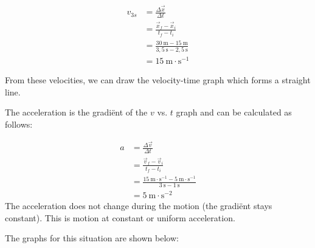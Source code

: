     \begin{align*}
    {v}_{3s}&= \frac{\Delta \vec{x}}{\Delta t}\\ 
    &= \frac{\vec{x}_{f}-\vec{x}_{i}}{{t}_{f}-{t}_{i}}\\ 
    &= \frac{30~\text{m}-15~\text{m}}{3,5~\text{s}-2,5~\text{s}}\\ 
    &= 15~\text{m}\ensuremath{\cdot}{\text{s}}^{-1}
      \end{align*}
        \par 
        \label{m38795*id72478}From these velocities, we can draw the velocity-time graph which forms a straight line.\par 
        \label{m38795*id72482}The acceleration is the gradi\"ent of the $v$ vs. $t$ graph and can be calculated as follows:\par 
        \label{m38795*id72504}\nopagebreak\noindent{}
          
    \begin{align*}
    a&= \frac{\Delta \vec{v}}{\Delta t} \\ 
    &= \frac{\vec{v}_{f}-\vec{v}_{i}}{{t}_{f}-{t}_{i}}\\ 
    &= \frac{15~\text{m}\ensuremath{\cdot}{\text{s}}^{-1}-5~\text{m}\ensuremath{\cdot}{\text{s}}^{-1}}{3~\text{s}-1~\text{s}}\\ 
    &= 5~\text{m}\ensuremath{\cdot}{\text{s}}^{-2}
      \end{align*}
        \label{m38795*id72716}The acceleration does not change during the motion (the gradi\"ent stays constant). This is motion at constant or uniform acceleration.\par 
        \label{m38795*id72723}The graphs for this situation are shown below:
    
